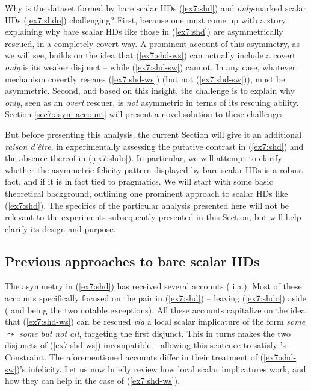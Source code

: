 Why is the dataset formed by bare scalar HDs (\ref{ex7:shd}) and \textit{only}-marked scalar HDs (\ref{ex7:shdo}) challenging? First, because one must come up with a story explaining why bare scalar HDs like those in (\ref{ex7:shd}) are asymmetrically rescued, in a completely covert way. A prominent account of this asymmetry, as we will see, builds on the idea that (\ref{ex7:shd-ws}) can actually include a covert \textit{only} is its weaker disjunct -- while (\ref{ex7:shd-sw}) cannot. In any case, whatever mechanism covertly rescues (\ref{ex7:shd-ws}) (but not (\ref{ex7:shd-sw})), must be asymmetric. Second, and based on this insight, the challenge is to explain why \textit{only}, seen as an \textit{overt} rescuer, is \textit{not} asymmetric in terms of its rescuing ability. Section \ref{sec7:asym-account} will present a novel solution to these challenges.

But before presenting this analysis, the current Section will give it an additional \textit{raison d'être}, in experimentally assessing the putative contrast in (\ref{ex7:shd}) and the absence thereof in (\ref{ex7:shdo}). In particular, we will attempt to clarify whether the asymmetric felicity pattern displayed by bare scalar HDs is a robust fact, and if it is in fact tied to pragmatics. We will start with some basic theoretical background, outlining one prominent approach to scalar HDs like (\ref{ex7:shd}). The specifics of the particular analysis presented here will not be relevant to the experiments subsequently presented in this Section, but will help clarify its design and purpose.

\subsection{Previous approaches to bare scalar HDs}

The asymmetry in (\ref{ex7:shd}) has received several accounts (\cite{Singh2008a, Singh2008b,Fox2018a,Ippolito2019,Tomioka2021,HenotMortier2023} i.a.). Most of these accounts specifically focused on the pair in (\ref{ex7:shd}) -- leaving (\ref{ex7:shdo}) aside (\cite{Singh2008b} and \cite{Ippolito2019} being the two notable exceptions). All these accounts capitalize on the idea that (\ref{ex7:shd-ws}) can be rescued \textit{via} a local scalar implicature of the form \textit{some $\leadsto$ \textit{some but not all}}, targeting the first disjunct. This in turns makes the two disjuncts of (\ref{ex7:shd-ws}) incompatible -- allowing this sentence to satisfy \citeauthor{Hurford1974}'s Constraint. The aforementioned accounts differ in their treatment of (\ref{ex7:shd-sw})'s infelicity. Let us now briefly review how local scalar implicatures work, and how they can help in the case of (\ref{ex7:shd-ws}).\\

